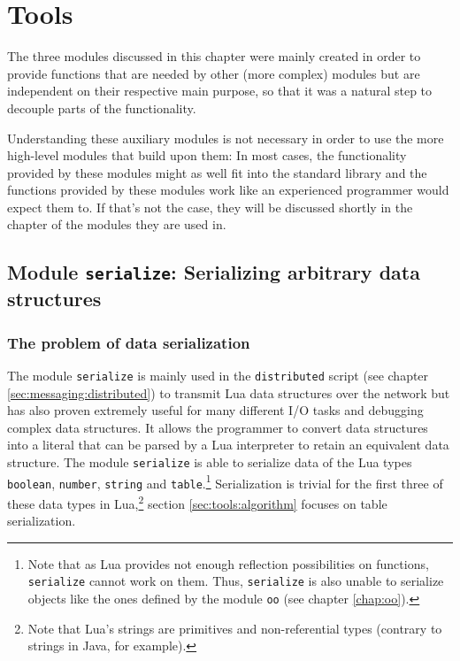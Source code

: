\chapter{Tools}
\label{chap:tools}
\label{chap:serialize}
\label{chap:typetools}
\label{chap:nd}

The three modules discussed in this chapter were mainly created in order to provide functions that are needed by other (more complex) modules but are independent on their respective main purpose, so that it was a natural step to decouple parts of the functionality.

Understanding these auxiliary modules is not necessary in order to use the more high-level modules that build upon them: In most cases, the functionality provided by these modules might as well fit into the standard library and the functions provided by these modules work like an experienced programmer would expect them to. If that's not the case, they will be discussed shortly in the chapter of the modules they are used in.

\section{Module \texttt{serialize}: Serializing arbitrary data structures}
\label{sec:tools:serialize}

\subsection{The problem of data serialization}
\label{sec:tools:serialize:problem}

The module \texttt{serialize} is mainly used in the \texttt{distributed} script (see chapter \ref{sec:messaging:distributed}) to transmit Lua data structures over the network but has also proven extremely useful for many different I/O tasks and debugging complex data structures. It allows the programmer to convert data structures into a literal that can be parsed by a Lua interpreter to retain an equivalent data structure. The module \texttt{serialize} is able to serialize data of the Lua types \texttt{boolean}, \texttt{number}, \texttt{string} and \texttt{table}.\footnote{Note that as Lua provides not enough reflection possibilities on functions, \texttt{serialize} cannot work on them. Thus, \texttt{serialize} is also unable to serialize objects like the ones defined by the module \texttt{oo} (see chapter \ref{chap:oo}).} Serialization is trivial for the first three of these data types in Lua,\footnote{Note that Lua's strings are primitives and non-referential types (contrary to strings in Java, for example).} section \ref{sec:tools:algorithm} focuses on table serialization.

